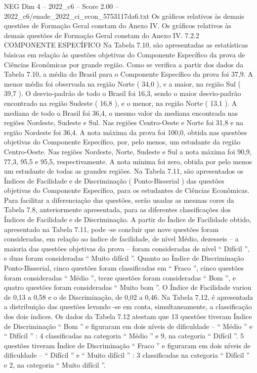 \begin{textsample}{NEG Dim 4 – 2022\_c6 – Score 2.00 – 2022\_c6/enade\_2022\_ci\_econ\_5753117da6.txt}
Os gráficos relativos às demais questões de Formação Geral constam do Anexo IV.
Os gráficos relativos às demais questões de Formação Geral constam do Anexo IV. 7.2.2 COMPONENTE ESPECÍFICO Na Tabela 7.10, são apresentadas as estatísticas básicas em relação às questões objetivas do Componente Específico da prova de Ciências Econômicas por grande região.
Como se verifica a partir dos dados da Tabela 7.10, a média do Brasil para o Componente Específico da prova foi 37,9.
A menor média foi observada na região Norte ( 34,0 ), e a maior, na região Sul ( 39,7 ).
O desvio-padrão de todo o Brasil foi 16,3, sendo o maior desvio-padrão encontrado na região Sudeste ( 16,8 ), e o menor, na região Norte ( 13,1 ).
A mediana de todo o Brasil foi 36,4, o mesmo valor da mediana encontrada nas regiões Nordeste, Sudeste e Sul.
Nas regiões Centro-Oeste e Norte foi 31,8 e na região Nordeste foi 36,4.
A nota máxima da prova foi 100,0, obtida nas questões objetivas do Componente Específico, por, pelo menos, um estudante da região Centro-Oeste.
Nas regiões Nordeste, Norte, Sudeste e Sul a nota máxima foi 90,9, 77,3, 95,5 e 95,5, respectivamente.
A nota mínima foi zero, obtida por pelo menos um estudante de todas as grandes regiões.
Na Tabela 7.11, são apresentados os Índices de Facilidade e de Discriminação ( Ponto-Bisserial ) das questões objetivas do Componente Específico, para os estudantes de Ciências Econômicas.
Para facilitar a diferenciação das questões, serão usadas as mesmas cores da Tabela 7.8, anteriormente apresentada, para as diferentes classificações dos Índices de Facilidade e de Discriminação.
A partir do Índice de Facilidade obtido, apresentado na Tabela 7.11, pode -se concluir que nove questões foram consideradas, em relação ao índice de facilidade, de nível Médio, dezesseis – a maioria das questões objetivas da prova – foram consideradas de nível “ Difícil ”, e duas foram consideradas “ Muito difícil ”.
Quanto ao Índice de Discriminação Ponto-Bisserial, cinco questões foram classificadas em “ Fraco ”, cinco questões foram consideradas “ Médio ”, treze questões foram consideradas “ Bom ”, e quatro questões foram consideradas “ Muito bom ”.
O Índice de Facilidade variou de 0,13 a 0,58 e o de Discriminação, de 0,02 a 0,46.
Na Tabela 7.12, é apresentada a distribuição das questões levando -se em conta, simultaneamente, a classificação dos dois índices.
Os dados da Tabela 7.12 atestam que 13 questões tiveram Índice de Discriminação “ Bom ” e figuraram em dois níveis de dificuldade – “ Médio ” e “ Difícil ” : 4 classificadas na categoria “ Médio ” e 9, na categoria “ Difícil ”. 5 questões tiveram Índice de Discriminação “ Fraco ” e figuraram em dois níveis de dificuldade – “ Difícil ” e “ Muito difícil ” : 3 classificadas na categoria “ Difícil ” e 2, na categoria “ Muito difícil ”.

\end{textsample}
